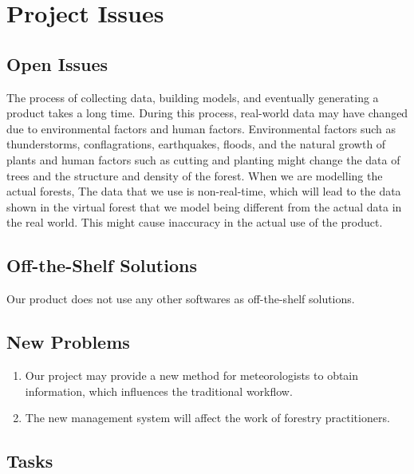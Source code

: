 \documentclass{article}
\begin{document}
\newpage

\section{Project Issues}
\subsection{Open Issues}
The process of collecting data, building models, and eventually generating a product takes a long time. During this process, real-world data may have changed due to environmental factors and human factors. Environmental factors such as thunderstorms, conflagrations, earthquakes, floods, and the natural growth of plants and human factors such as cutting and planting might change the data of trees and the structure and density of the forest. When we are modelling the actual forests, The data that we use is non-real-time, which will lead to the data shown in the virtual forest that we model being different from the actual data in the real world. This might cause inaccuracy in the actual use of the product.
\subsection{Off-the-Shelf Solutions}
Our product does not use any other softwares as off-the-shelf solutions. 

\subsection{New Problems}
\begin{enumerate}
    \item Our project may provide a new method for meteorologists to obtain information, which influences the traditional workflow. 
    \item The new management system will affect the work of forestry practitioners.
    
\end{enumerate}
\subsection{Tasks}
\end{document}
